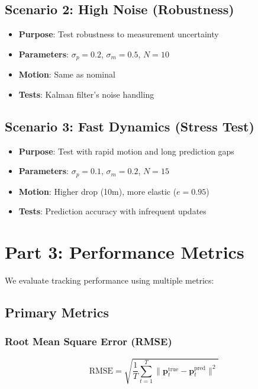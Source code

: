\documentclass[11pt]{article}
\begin{document}
\subsection{Scenario 2: High Noise (Robustness)}
\begin{itemize}
    \item \textbf{Purpose}: Test robustness to measurement uncertainty
    \item \textbf{Parameters}: $\sigma_p = 0.2$, $\sigma_m = 0.5$, $N = 10$
    \item \textbf{Motion}: Same as nominal
    \item \textbf{Tests}: Kalman filter's noise handling
\end{itemize}

\subsection{Scenario 3: Fast Dynamics (Stress Test)}
\begin{itemize}
    \item \textbf{Purpose}: Test with rapid motion and long prediction gaps
    \item \textbf{Parameters}: $\sigma_p = 0.1$, $\sigma_m = 0.2$, $N = 15$
    \item \textbf{Motion}: Higher drop (10m), more elastic ($e = 0.95$)
    \item \textbf{Tests}: Prediction accuracy with infrequent updates
\end{itemize}

\section{Part 3: Performance Metrics}

We evaluate tracking performance using multiple metrics:

\subsection{Primary Metrics}

\subsubsection{Root Mean Square Error (RMSE)}
\begin{equation}
\text{RMSE} = \sqrt{\frac{1}{T} \sum_{t=1}^{T} \|\mathbf{p}_t^{\text{true}} - \mathbf{p}_t^{\text{pred}}\|^2}
\end{equation}
\end{document}
